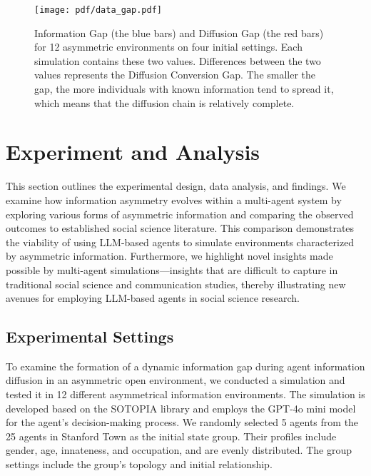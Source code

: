 




\begin{figure*}[ht]
    \centering
    \texttt{[image: pdf/data\_gap.pdf]}
    \caption{Information Gap (the blue bars) and Diffusion Gap (the red bars) for 12 asymmetric environments on four initial settings. Each simulation contains these two values. Differences between the two values represents the Diffusion Conversion Gap. The smaller the gap, the more individuals with known information tend to spread it, which means that the diffusion chain is relatively complete.}
    \label{fig:gap}
\end{figure*}



\section{Experiment and Analysis}
This section outlines the experimental design, data analysis, and findings. We examine how information asymmetry evolves within a multi-agent system by exploring various forms of asymmetric information and comparing the observed outcomes to established social science literature. This comparison demonstrates the viability of using LLM-based agents to simulate environments characterized by asymmetric information. Furthermore, we highlight novel insights made possible by multi-agent simulations—insights that are difficult to capture in traditional social science and communication studies, thereby illustrating new avenues for employing LLM-based agents in social science research.

\subsection{Experimental Settings}

To examine the formation of a dynamic information gap during agent information diffusion in an asymmetric open environment, we conducted a simulation and tested it in 12 different asymmetrical information environments.
The simulation is developed based on the SOTOPIA \cite{b53} library and employs the GPT-4o mini model \cite{b54} for the agent's decision-making process.
We randomly selected 5 agents from the 25 agents in Stanford Town \cite{m9} as the initial state group. 
Their profiles include gender, age, innateness, and occupation, and are evenly distributed. 
The group settings include the group's topology and initial relationship.



